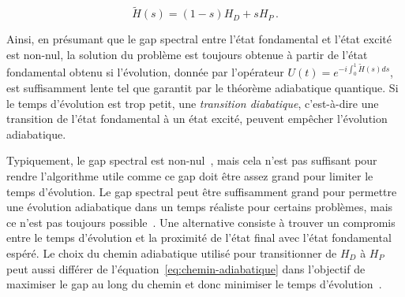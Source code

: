 \begin{equation}
\label{eq:chemin-adiabatique}    
    \tilde{H}(s) = \left(1-s\right) H_{D} + s H_{P} \,.
\end{equation}

Ainsi, en présumant que le gap spectral entre l'état fondamental et l'état excité est non-nul, la solution du problème est toujours obtenue à partir de l'état fondamental obtenu si l'évolution, donnée par l'opérateur $U(t) = e^{-i \int_{0}^{1} \tilde{H}(s) ds}$, est suffisamment lente tel que garantit par le théorème adiabatique quantique. Si le temps d'évolution est trop petit, une \textit{transition diabatique}, c'est-à-dire une transition de l'état fondamental à un état excité, peuvent empêcher l'évolution adiabatique.


Typiquement, le gap spectral est non-nul~\cite{farhiQuantumComputationAdiabatic2000}, mais cela n'est pas suffisant pour rendre l'algorithme utile comme ce gap doit être assez grand pour limiter le temps d'évolution. Le gap spectral peut être suffisamment grand pour permettre une évolution adiabatique dans un temps réaliste pour certains problèmes, mais ce n'est pas toujours possible~\cite{altshulerAndersonLocalizationMakes2010}. Une alternative consiste à trouver un compromis entre le temps d'évolution et la proximité de l'état final avec l'état fondamental espéré. Le choix du chemin adiabatique utilisé pour transitionner de $H_{D}$ à $H_{P}$ peut aussi différer de l'équation~\ref{eq:chemin-adiabatique} dans l'objectif de maximiser le gap au long du chemin et donc minimiser le temps d'évolution~\cite{nishimoriExponentialEnhancementEfficiency2017, hormoziNonstoquasticHamiltoniansQuantum2017}.

